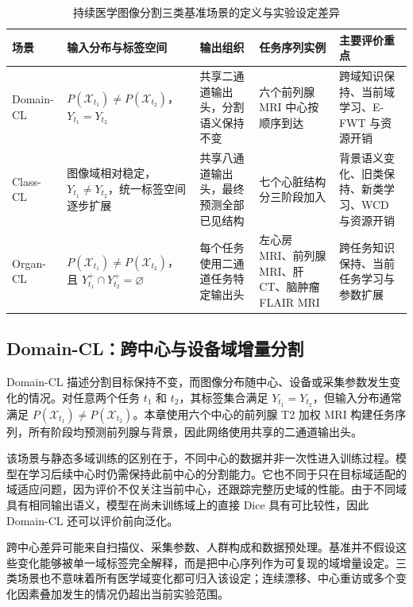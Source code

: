 \begin{table}[htbp]
\centering
\caption{持续医学图像分割三类基准场景的定义与实验设定差异}
\label{tab:benchmark-scenarios}
\thesistablefont
\setlength{\tabcolsep}{3pt}
\renewcommand{\arraystretch}{1.18}
\begin{tabularx}{\textwidth}{@{}p{1.85cm}XXXX@{}}
\toprule
场景 & 输入分布与标签空间 & 输出组织 & 任务序列实例 & 主要评价重点 \\
\midrule
Domain-CL &
$P(\mathcal{X}_{t_1})\neq P(\mathcal{X}_{t_2})$，$Y_{t_1}=Y_{t_2}$ &
共享二通道输出头，分割语义保持不变 &
六个前列腺 MRI 中心按顺序到达 &
跨域知识保持、当前域学习、E-FWT 与资源开销 \\
\addlinespace
Class-CL &
图像域相对稳定，$Y_{t_1}\neq Y_{t_2}$，统一标签空间逐步扩展 &
共享八通道输出头，最终预测全部已见结构 &
七个心脏结构分三阶段加入 &
背景语义变化、旧类保持、新类学习、WCD 与资源开销 \\
\addlinespace
Organ-CL &
$P(\mathcal{X}_{t_1})\neq P(\mathcal{X}_{t_2})$，且 $Y^{+}_{t_1}\cap Y^{+}_{t_2}=\varnothing$ &
每个任务使用二通道任务特定输出头 &
左心房 MRI、前列腺 MRI、肝 CT、脑肿瘤 FLAIR MRI &
跨任务知识保持、当前任务学习与参数扩展 \\
\bottomrule
\end{tabularx}

\end{table}

\subsection{Domain-CL：跨中心与设备域增量分割}
\label{subsec:benchmark-domain-cl}

Domain-CL 描述分割目标保持不变，而图像分布随中心、设备或采集参数发生变化的情况。对任意两个任务 $t_1$ 和 $t_2$，其标签集合满足 $Y_{t_1}=Y_{t_2}$，但输入分布通常满足
$P(\mathcal{X}_{t_1})\neq P(\mathcal{X}_{t_2})$。本章使用六个中心的前列腺 T2 加权 MRI 构建任务序列，所有阶段均预测前列腺与背景，因此网络使用共享的二通道输出头。

该场景与静态多域训练的区别在于，不同中心的数据并非一次性进入训练过程。模型在学习后续中心时仍需保持此前中心的分割能力。它也不同于只在目标域适配的域适应问题，因为评价不仅关注当前中心，还跟踪完整历史域的性能。由于不同域具有相同输出语义，模型在尚未训练域上的直接 Dice 具有可比较性，因此 Domain-CL 还可以评价前向泛化。

跨中心差异可能来自扫描仪、采集参数、人群构成和数据预处理。基准并不假设这些变化能够被单一域标签完全解释，而是把中心序列作为可复现的域增量设定。三类场景也不意味着所有医学域变化都可归入该设定；连续漂移、中心重访或多个变化因素叠加发生的情况仍超出当前实验范围。


